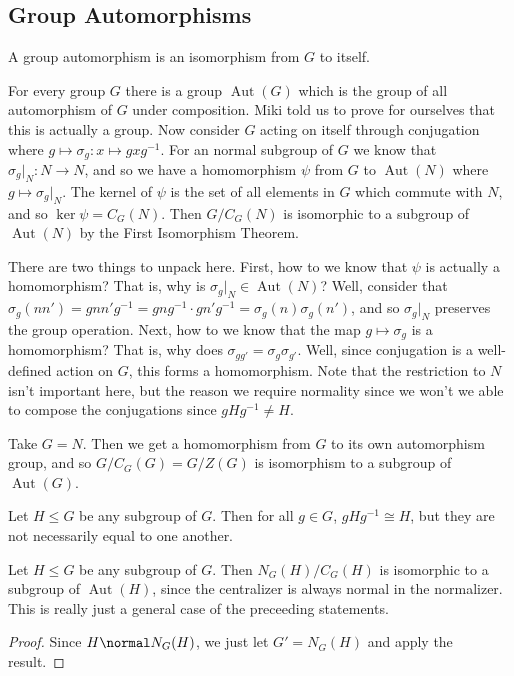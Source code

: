 \subsection{Group Automorphisms}

\begin{definition}[Automorphism]
A group automorphism is an isomorphism from $G$ to itself.
\end{definition}

For every group $G$ there is a group $\operatorname{Aut}(G)$ which is the group of all automorphism of $G$ under composition. Miki told us to prove for ourselves that this is actually a group. Now consider $G$ acting on itself through conjugation where $g \mapsto \sigma_g : x \mapsto gxg^{-1}$. For an normal subgroup of $G$ we know that $\sigma_g|_N : N \to N$, and so we have a homomorphism $\psi$ from $G$ to $\operatorname{Aut}(N)$ where $g \mapsto \sigma_g |_N$. The kernel of $\psi$ is the set of all elements in $G$ which commute with $N$, and so $\ker \psi = C_G(N)$. Then $G/C_G(N)$ is isomorphic to a subgroup of $\operatorname{Aut}(N)$ by the First Isomorphism Theorem.

There are two things to unpack here. First, how to we know that $\psi$ is actually a homomorphism? That is, why is $\sigma_g|_N \in \operatorname{Aut}(N)$? Well, consider that $\sigma_g(nn') = gnn'g^{-1} = gng^{-1} \cdot gn'g^{-1} = \sigma_g(n)\sigma_g(n')$, and so $\sigma_g |_N$ preserves the group operation. Next, how to we know that the map $g \mapsto \sigma_g$ is a homomorphism? That is, why does $\sigma_{gg'} = \sigma_{g}\sigma_{g'}$. Well, since conjugation is a well-defined action on $G$, this forms a homomorphism. Note that the restriction to $N$ isn't important here, but the reason we require normality since we won't we able to compose the conjugations since $gHg^{-1} \not= H$.

\begin{corollary}
Take $G = N$. Then we get a homomorphism from $G$ to its own automorphism group, and so $G/C_G(G) = G/Z(G)$ is isomorphism to a subgroup of $\operatorname{Aut}(G)$.
\end{corollary}

\begin{corollary}
Let $H \leq G$ be any subgroup of $G$. Then for all $g \in G$, $gHg^{-1} \cong H$, but they are not necessarily equal to one another.
\end{corollary}

\begin{corollary}
Let $H \leq G$ be any subgroup of $G$. Then $N_G(H) / C_G(H)$ is isomorphic to a subgroup of $\operatorname{Aut}(H)$, since the centralizer is always normal in the normalizer. This is really just a general case of the preceeding statements.
\end{corollary}

\begin{proof}
Since $H \normal N_G(H)$, we just let $G' = N_G(H)$ and apply the result.
\end{proof}